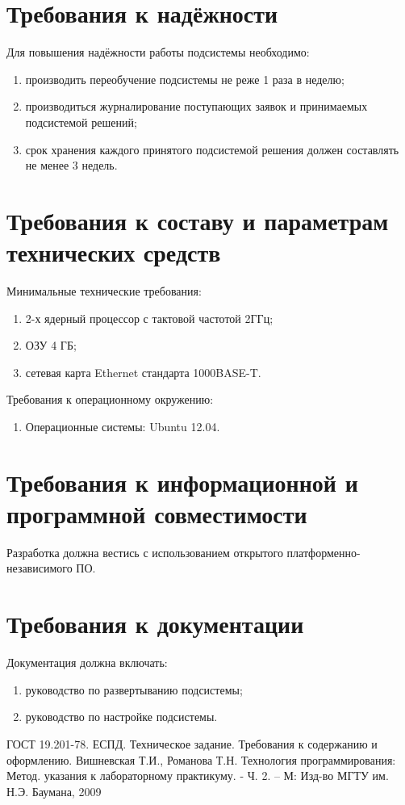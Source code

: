 \documentclass[utf8x, 12pt]{G7-32}
\begin{document}
\section{Требования к надёжности}

Для повышения надёжности работы подсистемы необходимо:
\begin{enumerate}
        \item производить переобучение подсистемы не реже 1 раза в неделю;
        \item производиться журналирование поступающих заявок и принимаемых 
        подсистемой решений;
        \item срок хранения каждого принятого подсистемой решения должен составлять не 
        менее 3 недель.
\end{enumerate}

\section{Требования к составу и параметрам технических средств}

Минимальные технические требования:
\begin{enumerate}
        \item 2-х ядерный процессор с тактовой частотой 2ГГц;
        \item ОЗУ 4 ГБ;
        \item сетевая карта Ethernet стандарта 1000BASE-T.
\end{enumerate}

Требования к операционному окружению:
\begin{enumerate}
        \item Операционные системы: Ubuntu 12.04.
\end{enumerate}

\section{Требования к информационной и программной совместимости}
Разработка должна вестись с использованием открытого платформенно-независимого ПО.

\section{Требования к документации}

Документация должна включать:
\begin{enumerate}
        \item руководство по развертыванию подсистемы;
        \item руководство по настройке подсистемы.
\end{enumerate}

\backmatter

\begin{thebibliography}{00}
         ГОСТ 19.201-78. ЕСПД. Техническое задание. Требования к содержанию и оформлению.
         Вишневская Т.И., Романова Т.Н. Технология программирования: Метод. указания к лабораторному практикуму. - Ч. 2. – М: Изд-во МГТУ им. Н.Э. Баумана, 2009
\end{thebibliography}
\end{document}
